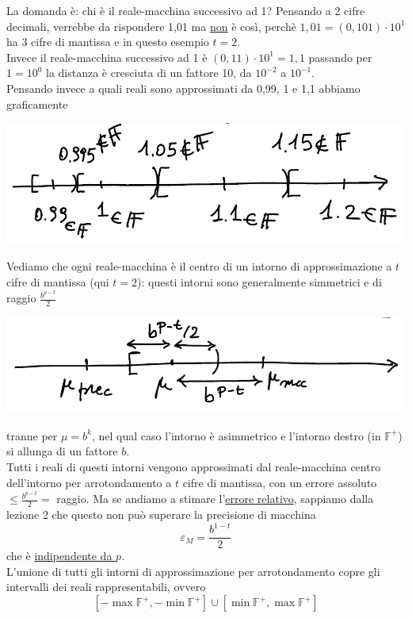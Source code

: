 \documentclass[12pt]{article}
\begin{document}
La domanda è: chi è il reale-macchina successivo ad 1? Pensando a 2 cifre decimali, verrebbe da rispondere 1,01 ma \uline{non} è così, perchè $1,01 = (0,101)\cdot 10^1$ ha 3 cifre di mantissa e in questo esempio $t=2$.\\
Invece il reale-macchina successivo ad 1 è $(0,11)\cdot 10^1 = 1,1$ passando per $1 = 10^0$ la distanza è cresciuta di un fattore 10, da $10^{-2}$ a $10^{-1}$.\\
Pensando invece a quali reali sono approssimati da 0,99, 1 e 1,1 abbiamo graficamente
\begin{center}
    \includegraphics[scale=0.65]{img7.png}
\end{center}
Vediamo che ogni reale-macchina è il centro di un intorno di approssimazione a $t$ cifre di mantissa (qui $t=2$): questi intorni sono generalmente simmetrici e di raggio $\frac{b^{p-t}}{2}$ \begin{center}
    \includegraphics[scale=0.65]{img8.png}
\end{center}
tranne per $\mu = b^k$, nel qual caso l'intorno è asimmetrico e l'intorno destro (in $\mathbb{F}^+$) si allunga di un fattore $b$.\\
Tutti i reali di questi intorni vengono approssimati dal reale-macchina centro dell'intorno per arrotondamento a $t$ cifre di mantissa, con un errore assoluto $\le \frac{b^{p-t}}{2} =$ raggio. Ma se andiamo a stimare l'\uline{errore relativo}, sappiamo dalla lezione 2 che questo non può superare la precisione di macchina \[ \varepsilon_M = \frac{b^{1-t}}{2} \]
che è \uline{indipendente da $p$}.\\
L'unione di tutti gli intorni di approssimazione per arrotondamento copre gli intervalli dei reali rappresentabili, ovvero
\[ [- \max \mathbb{F}^+ , - \min \mathbb{F}^+] \cup [\min \mathbb{F}^+ , \max \mathbb{F}^+]\]
\end{document}
